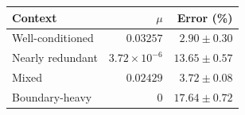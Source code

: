 \begin{tabular}{lrr}\toprule
Context&$\mu$&Error (\%)\\
\midrule
Well-conditioned & $0.03257$ & $2.90\pm0.30$ \\
Nearly redundant & $3.72\times10^{-6}$ & $13.65\pm0.57$ \\
Mixed & $0.02429$ & $3.72\pm0.08$ \\
Boundary-heavy & $0$ & $17.64\pm0.72$ \\
\bottomrule\end{tabular}
